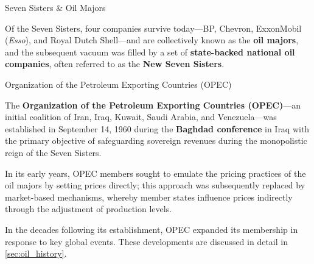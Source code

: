 \documentclass[10pt]{article}
\begin{document}
    \begin{core}[label=core:seven_sisters]{Seven Sisters \& Oil Majors}


      Of the Seven Sisters, four companies survive today---BP, Chevron, ExxonMobil (\textit{Esso}), and Royal Dutch Shell---and are collectively known as the \textbf{oil majors}, and the subsequent vacuum was filled by a set of \textbf{state-backed national oil companies}, often referred to as the \textbf{New Seven Sisters}. 


    \end{core}

    \begin{core}[label=core:opec]{Organization of the Petroleum Exporting Countries (OPEC)}

      The \textbf{Organization of the Petroleum Exporting Countries (OPEC)}---an initial coalition of Iran, Iraq, Kuwait, Saudi Arabia, and Venezuela---was established in September 14, 1960 during the \textbf{Baghdad conference} in Iraq with the primary objective of safeguarding sovereign revenues during the monopolistic reign of the Seven Sisters.

      In its early years, OPEC members sought to emulate the pricing practices of the oil majors by setting prices directly; this approach was subsequently replaced by market-based mechanisms, whereby member states influence prices indirectly through the adjustment of production levels.

      In the decades following its establishment, OPEC expanded its membership in response to key global events. These developments are discussed in detail in \autoref{sec:oil_history}.


    \end{core}
\end{document}
